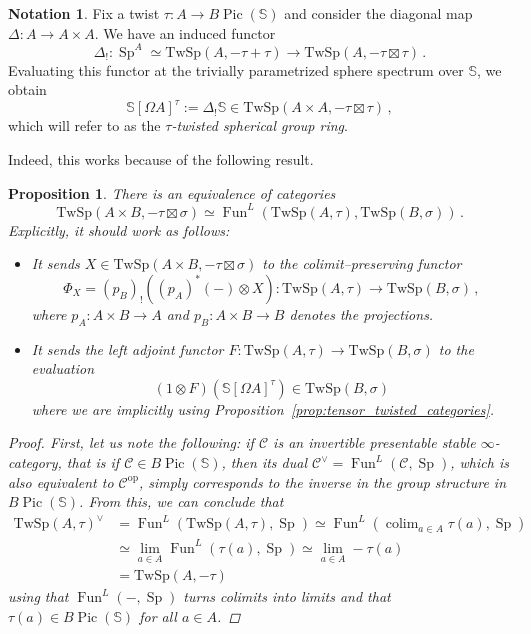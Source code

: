 \documentclass[10pt]{amsart}
\newcommand{\longto}{\longrightarrow}
\theoremstyle{plain}
\newtheorem{proposition}[theorem]{Proposition}
\theoremstyle{definition}
\newtheorem{notation}[theorem]{Notation}
\DeclareMathOperator*{\colim}{colim}
\DeclareMathOperator{\Sp}{Sp}
\DeclareMathOperator{\Fun}{Fun}
\DeclareMathOperator{\Pic}{Pic}
\newcommand{\oop}{\mathrm{op}}
\newcommand{\bS}{\mathbb{S}}
\newcommand{\cC}{\mathcal{C}}
\newcommand{\TwSp}{\mathrm{TwSp}}
\begin{document}
\begin{notation}
    Fix a twist $\tau : A \to B\Pic(\bS)$ and consider the diagonal map $\Delta : A \to A \times A$.
    We have an induced functor
    \[
    \Delta_! : \Sp^{A} \simeq \TwSp(A , -\tau + \tau) \longto \TwSp(A, -\tau \boxtimes \tau) \,.
    \]
    Evaluating this functor at the trivially parametrized sphere spectrum over $\bS$, we obtain
    \[
    \bS[\Omega A]^\tau := \Delta_! \bS \in \TwSp(A \times A , -\tau \boxtimes \tau) \,,
    \]
    which will refer to as the \emph{$\tau$-twisted spherical group ring}.
\end{notation}
Indeed, this works because of the following result.

\begin{proposition} \label{prop:FunL_exterior}
  There is an equivalence of categories
  \[
  \TwSp(A \times B, -\tau \boxtimes \sigma) \simeq \Fun^L(\TwSp(A,\tau),\TwSp(B,\sigma)) \,.
  \]
  Explicitly, it should work as follows:
  \begin{itemize}
    \item It sends $X \in \TwSp(A \times B , -\tau \boxtimes \sigma)$ to the colimit--preserving functor
    \[
    \Phi_{X} = (p_B)_!((p_A)^*(-) \otimes X) : \TwSp(A,\tau) \longto \TwSp(B,\sigma) \,,
    \]
    where $p_A : A \times B \to A$ and $p_B : A \times B \to B$ denotes the projections.
    \item It sends the left adjoint functor $F: \TwSp(A,\tau) \to \TwSp(B,\sigma)$ to the evaluation
    \[
    (1 \otimes F)(\bS[\Omega A]^{\tau}) \in \TwSp(B,\sigma)
    \]
    where we are implicitly using Proposition~\ref{prop:tensor_twisted_categories}.
  \end{itemize}
  \begin{proof}
    First, let us note the following: if $\cC$ is an invertible presentable stable $\infty$-category, that is if $\cC \in B\Pic(\bS)$, then its dual $\cC^{\vee} = \Fun^L(\cC,\Sp)$, which is also equivalent to $\cC^{\oop}$, simply corresponds to the inverse in the group structure in $B\Pic(\bS)$.
    From this, we can conclude that
    \begin{align*}
    \TwSp(A, \tau)^{\vee} &= \Fun^L(\TwSp(A,\tau),\Sp) \simeq \Fun^L(\colim_{ a \in A} \tau(a) , \Sp) \\ &\simeq \lim_{a \in A} \Fun^L(\tau(a),\Sp) \simeq \lim_{a \in A}-\tau(a)  \\ &= \TwSp(A,-\tau)
    \end{align*}
    using that $\Fun^L(-,\Sp)$ turns colimits into limits and that $\tau(a) \in B\Pic(\bS)$ for all $a \in A$.


\end{proof}
\end{proposition}
\end{document}
